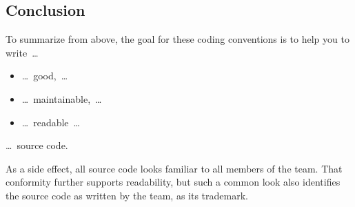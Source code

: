 \subsection{Conclusion}
To summarize from above, the goal for these coding conventions is to help you to write~…
\begin{itemize}[nosep]
	\item …~good,~…
	\item …~maintainable,~…
	\item …~readable~…
\end{itemize}
…~\Java source code.

As a side effect, all source code looks familiar to all members of the team. That conformity further supports readability, but such a common look also identifies the source code as written by the team, as its trademark.

